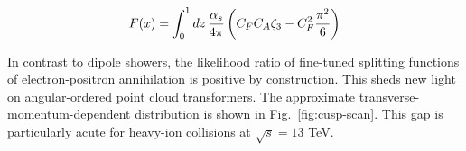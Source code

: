 \begin{equation}
  F(x) = \int_0^1 dz \, \frac{\alpha_s}{4\pi} \left( C_F C_A \zeta_{3} - C_F^2 \frac{\pi^2}{6} \right)
  \label{eq:6}
\end{equation}

In contrast to dipole showers, the likelihood ratio of fine-tuned
splitting functions of electron-positron annihilation is positive by
construction. This sheds new light on angular-ordered point cloud
transformers. The approximate transverse-momentum-dependent distribution
is shown in Fig.~\ref{fig:cusp-scan}. This gap is particularly acute for
heavy-ion collisions at $\sqrt{s} = 13$ TeV.


